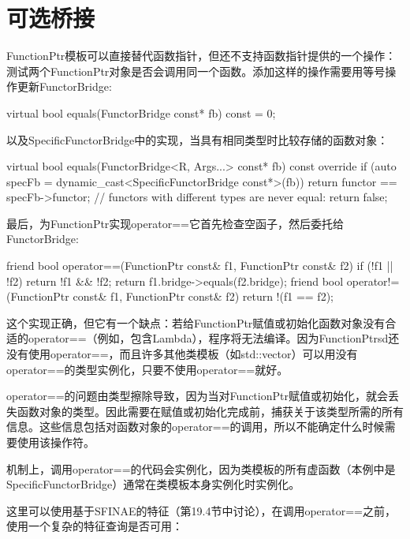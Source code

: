 \section{可选桥接}
FunctionPtr模板可以直接替代函数指针，但还不支持函数指针提供的一个操作：测试两个FunctionPtr对象是否会调用同一个函数。添加这样的操作需要用等号操作更新FunctorBridge:

\begin{cpp}
virtual bool equals(FunctorBridge const* fb) const = 0;
\end{cpp}

以及SpecificFunctorBridge中的实现，当具有相同类型时比较存储的函数对象：

\begin{cpp}
virtual bool equals(FunctorBridge<R, Args...> const* fb) const override {
	if (auto specFb = dynamic_cast<SpecificFunctorBridge const*>(fb)) {
		return functor == specFb->functor;
	}
	// functors with different types are never equal:
	return false;
}
\end{cpp}

最后，为FunctionPtr实现operator==它首先检查空函子，然后委托给FunctorBridge:

\begin{cpp}
friend bool
operator==(FunctionPtr const& f1, FunctionPtr const& f2) {
	if (!f1 || !f2) {
		return !f1 && !f2;
	}
	return f1.bridge->equals(f2.bridge);
}
friend bool
operator!=(FunctionPtr const& f1, FunctionPtr const& f2) {
	return !(f1 == f2);
}
\end{cpp}

这个实现正确，但它有一个缺点：若给FunctionPtr赋值或初始化函数对象没有合适的operator==（例如，包含Lambda），程序将无法编译。因为FunctionPtrsd还没有使用operator==，而且许多其他类模板（如std::vector）可以用没有operator==的类型实例化，只要不使用operator==就好。

operator==的问题由类型擦除导致，因为当对FunctionPtr赋值或初始化，就会丢失函数对象的类型。因此需要在赋值或初始化完成前，捕获关于该类型所需的所有信息。这些信息包括对函数对象的operator==的调用，所以不能确定什么时候需要使用该操作符。

\begin{notice}
机制上，调用operator==的代码会实例化，因为类模板的所有虚函数（本例中是SpecificFunctorBridge）通常在类模板本身实例化时实例化。
\end{notice}

这里可以使用基于SFINAE的特征（第19.4节中讨论），在调用operator==之前，使用一个复杂的特征查询是否可用：


